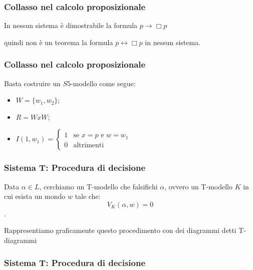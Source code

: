 \documentclass[notheorem]{beamer}
\begin{document}
\begin{frame}
\frametitle{Collasso nel calcolo proposizionale}
In nessun sistema è dimostrabile la formula $p \rightarrow \Box p$

quindi non è un teorema la formula $p \leftrightarrow \Box p$ in nessun sistema.
\end{frame}

\begin{frame}
\frametitle{Collasso nel calcolo proposizionale}
Basta costruire un $S5$-modello come segue:
\begin{itemize}
    \item $W = \{w_1, w_2\}$;
    \item $R = W x W$;
    \item $I(1, w_1) = \begin{cases}
                      1 & \mbox{se } x = p \mbox{ e } w = w_1 \\
                      0 & \mbox{altrimenti}
    \end{cases}$
\end{itemize}
\end{frame}

\begin{frame}
\frametitle{Sistema T: Procedura di decisione}
Data $\alpha \in L$, cerchiamo un T-modello che falsifichi $\alpha$, ovvero un T-modello $K$
in cui esista un mondo $w$ tale che: $$V_K(\alpha, w) = 0$$.

Rappresentiamo graficamente questo procedimento con dei diagrammi detti T-diagrammi
\end{frame}


\begin{frame}
\frametitle{Sistema T: Procedura di decisione}
\begin{center}
\end{center}
\end{frame}
\end{document}
